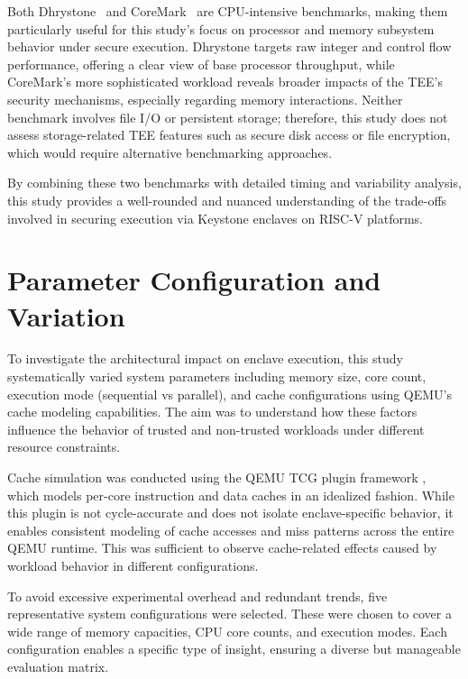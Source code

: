 Both Dhrystone~\cite{weiss2002dhrystone} and CoreMark~\cite{gal2012exploring} are CPU-intensive benchmarks, making them particularly useful for this study’s focus on processor and memory subsystem behavior under secure execution. Dhrystone targets raw integer and control flow performance, offering a clear view of base processor throughput, while CoreMark’s more sophisticated workload reveals broader impacts of the TEE’s security mechanisms, especially regarding memory interactions. Neither benchmark involves file I/O or persistent storage; therefore, this study does not assess storage-related TEE features such as secure disk access or file encryption, which would require alternative benchmarking approaches.

By combining these two benchmarks with detailed timing and variability analysis, this study provides a well-rounded and nuanced understanding of the trade-offs involved in securing execution via Keystone enclaves on RISC-V platforms.

\section{Parameter Configuration and Variation}
\label{sec:param-variation}

To investigate the architectural impact on enclave execution, this study systematically varied system parameters including memory size, core count, execution mode (sequential vs parallel), and cache configurations using QEMU’s cache modeling capabilities. The aim was to understand how these factors influence the behavior of trusted and non-trusted workloads under different resource constraints.

Cache simulation was conducted using the QEMU TCG plugin framework \cite{mandour2021cache}, which models per-core instruction and data caches in an idealized fashion. While this plugin is not cycle-accurate and does not isolate enclave-specific behavior, it enables consistent modeling of cache accesses and miss patterns across the entire QEMU runtime. This was sufficient to observe cache-related effects caused by workload behavior in different configurations.

To avoid excessive experimental overhead and redundant trends, five representative system configurations were selected. These were chosen to cover a wide range of memory capacities, CPU core counts, and execution modes. Each configuration enables a specific type of insight, ensuring a diverse but manageable evaluation matrix.

